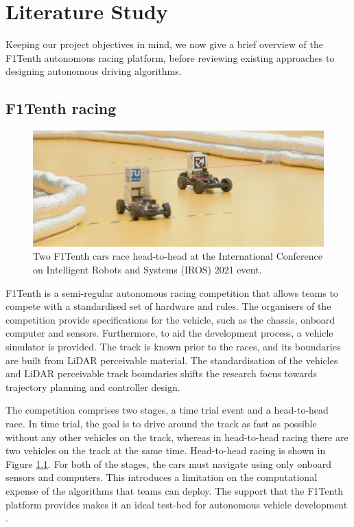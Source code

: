 \chapter{Literature Study}
\label{chp:litreview}

Keeping our project objectives in mind, we now give a brief overview of the F1Tenth autonomous racing platform, before reviewing existing approaches to designing autonomous driving algorithms.


\section{F1Tenth racing}
\label{sec:f1tenth}

\begin{figure}[b]
    \centering
    \includegraphics[width=\textwidth*7/10]{contents/chapt2/figs/f1tenth_prague_1.png}
    \caption[Two F1Tenth cars racing head-to-head]{Two F1Tenth cars race head-to-head at the International Conference on Intelligent Robots and Systems (IROS) 2021 event.}
    \label{fig:f1tenth_prague}
\end{figure}

F1Tenth is a semi-regular autonomous racing competition that allows teams to compete with a standardised set of hardware and rules.
The organisers of the competition provide specifications for the vehicle, such as the chassis, onboard computer and sensors.
Furthermore, to aid the development process, a vehicle simulator is provided. 
The track is known prior to the races, and its boundaries are built from LiDAR perceivable material.
The standardisation of the vehicles and LiDAR perceivable track boundaries shifts the research focus towards trajectory planning and controller design.

The competition comprises two stages, a time trial event and a head-to-head race.
In time trial, the goal is to drive around the track as fast as possible without any other vehicles on the track, whereas in head-to-head racing there are two vehicles on the track at the same time.
Head-to-head racing is shown in Figure \ref{fig:f1tenth_prague}.
For both of the stages, the cars must navigate using only onboard sensors and computers. 
This introduces a limitation on the computational expense of the algorithms that teams can deploy.
The support that the F1Tenth platform provides makes it an ideal test-bed for autonomous vehicle development \cite{f1tenth}.


